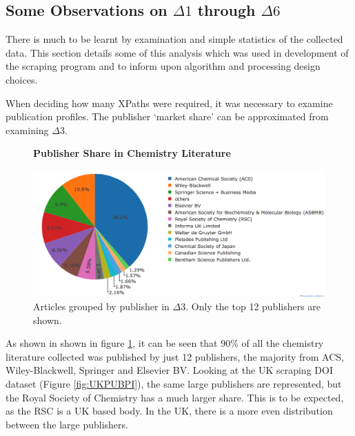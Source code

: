 \subsection{Some Observations on $\Delta1$ through $\Delta6$}
\label{sec:CORPUSOBSERVATIONS}
There is much to be learnt by examination and simple statistics of the collected data. This section details some of this analysis which was used in development of the scraping program and to inform upon algorithm and processing design choices.

When deciding how many XPaths were required, it was necessary to examine publication profiles.
The publisher `market share' can be approximated from examining $\Delta3$.
\begin{figure}[H]
    \centering
    \textbf{Publisher Share in Chemistry Literature}\par\medskip
    \includegraphics[width=\textwidth]{Data_Acquisition/publishers_pie.png}
    \caption[Publisher Share in Chemistry Literature]{Articles grouped by publisher in $\Delta3$. Only the top 12 publishers are shown.}
     \label{fig:PUBPI}
\end{figure}
As shown in  shown in figure \ref{fig:PUBPI}, it can be seen that 90\% of all the chemistry literature collected was published by just 12 publishers, the majority from ACS, Wiley-Blackwell, Springer and Elsevier BV. Looking at the UK scraping DOI dataset (Figure \ref{fig:UKPUBPI}), the same large publishers are represented, but the Royal Society of Chemistry has a much larger share. This is to be expected, as the RSC is a UK based body. In the UK, there is a more even distribution between the large publishers. 

